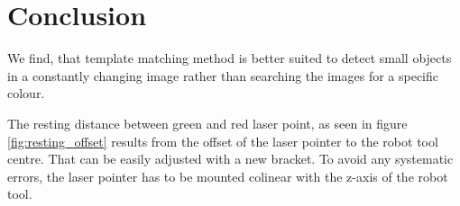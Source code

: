 \documentclass[./\jobname.tex]{subfiles}
\begin{document}
\begin{figure}[h]
	\centering
	\noindent{}
	\label{fig:main_app_flowchart}
\end{figure}


\chapter{Conclusion}

We find, that template matching method is better suited to detect small objects in a constantly changing image rather than searching the images for a specific colour.

The resting distance between green and red laser point, as seen in figure \ref{fig:resting_offset} results from the offset of the laser pointer to the robot tool centre. That can be easily adjusted with a new bracket. To avoid any systematic errors, the laser pointer has to be mounted colinear with the z-axis of the robot tool.  
\end{document}
